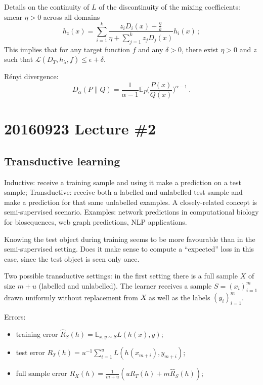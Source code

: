 \documentclass[a4paper]{article}
\newcommand{\ex}{\mathbb{E}}
\begin{document}
Details on the continuity of $L$ of the discontinuity of the mixing coefficients:
smear $\eta > 0$ across all domains
\[ h_z(x) = \sum_{i=1}^k \frac{z_i D_i(x) + \frac{\eta}{k}}{\eta + \sum_{j=1}^k z_j D_j(x)} h_i(x)
    \,;\]
This implies that for any target function $f$ and any $\delta>0$, there exist $\eta>0$
and $z$ such that $\mathcal{L}(D_T, h_\lambda, f) \leq \epsilon + \delta$.

R\'enyi divergence:
\[ D_\alpha(P\|Q)
    = \frac{1}{\alpha - 1} \ex_P \biggl(\frac{P(x)}{Q(x)}\biggr)^{\alpha - 1}
    \,. \]



\section{20160923 Lecture \#2} %
\label{sec:20160923_lecture_2}

\subsection{Transductive learning} %
\label{sub:transductive_learning}

Inductive: receive a training sample and using it make a prediction on a test sample;
Transductive: receive both a labelled and unlabelled test sample and make a prediction
for that same unlabelled examples. A closely-related concept is semi-supervised
scenario. Examples: network predictions in computational biology for biosequences,
web graph predictions, NLP applications.

Knowing the test object during training seems to be more favourable than in the
semi-supervised setting. Does it make sense to compute a ``expected'' loss in this
case, since the test object is seen only once.

Two possible transductive settings: in the first setting there is a full sample
$X$ of size $m + u$ (labelled and unlabelled). The learner receives a sample $S=(x_i)_{i=1}^m$
drawn uniformly without replacement from $X$ as well as the labels $(y_i)_{i=1}^m$.

Errors:\begin{itemize}
    \item training error $\hat{R}_S(h) = \ex_{x, y\sim S} L(h(x), y)$;
    \item test error $R_T(h) = u^{-1} \sum_{i=1}^u L(h(x_{m+i}), y_{m+i})$;
    \item full sample error $R_X(h) = \frac{1}{m+u}(u R_T(h) + m \hat{R}_S(h))$;
\end{itemize}
\end{document}
